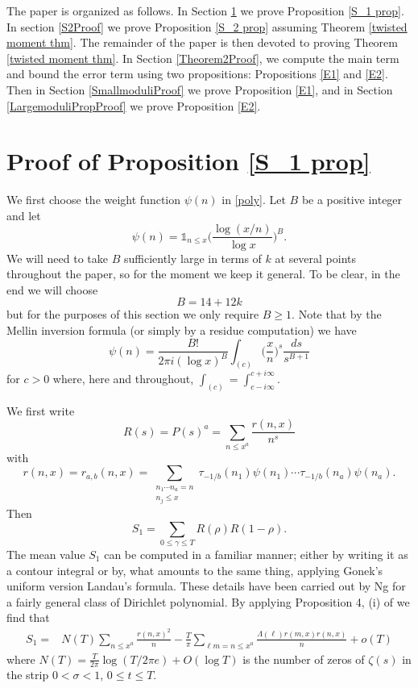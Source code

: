 \documentclass[oneside, 12pt]{amsart}
\theoremstyle{definition}
\newcommand{\leqs}{\leqslant }
\newcommand{\geqs}{\geqslant }
\begin{document}
The paper is organized as follows. In Section \ref{S1Proof} we prove Proposition \ref{S_1 prop}. In section \ref{S2Proof} we prove Proposition \ref{S_2 prop} assuming Theorem \ref{twisted moment thm}. The remainder of the paper is then devoted to proving Theorem \ref{twisted moment thm}. In Section \ref{Theorem2Proof}, we compute the main term and bound the error term using two propositions: Propositions \ref{E1} and \ref{E2}. Then in Section \ref{SmallmoduliProof} we prove Proposition \ref{E1}, and in Section \ref{LargemoduliPropProof} we prove Proposition \ref{E2}.













\section{Proof of Proposition \ref{S_1 prop}}\label{S1Proof}
We first choose the weight function $\psi(n)$ in \eqref{poly}. Let $B$ be a positive integer and let
\begin{equation}
\label{psi choice}
\psi(n)=\mathds{1}_{n\leqs x}\bigg(\frac{\log(x/n)}{\log x}\bigg)^B.
\end{equation}
We will need to take $B$ sufficiently large in terms of $k$ at several points throughout the paper, so for the moment we keep it general. To be clear, in the end we will choose 
\[
B=14+12k
\] 
but for the purposes of this section we only require $B\geqs 1$. 
Note that by the Mellin inversion formula (or simply by a residue computation) we have 
\begin{equation}
\label{mellin}
\psi(n)=\frac{B!}{2\pi i(\log x)^B  }\int_{(c)}\bigg(\frac{x}{n}\bigg)^s\frac{ds}{s^{B+1}}
\end{equation}
for $c>0$ where, here and throughout, $\int_{(c)}=\int_{c-i\infty}^{c+i\infty}$.

We first write
\[
R(s)=P(s)^a=\sum_{n\leqs x^a}\frac{r(n,x)}{n^s}
\]
with
\[
r(n,x)=r_{a,b}(n,x)=\sum_{\substack{n_1\cdots n_a=n \\ n_j\leqs x}}\tau_{-1/b}(n_1)\psi(n_1)\cdots \tau_{-1/b}(n_a)\psi(n_a).
\]
Then 
\[
S_1=\sum_{0\leqs \gamma\leqs T}R(\rho)R(1-\rho).
\]
The mean value $S_1$ can be computed in a familiar manner; either by writing it as a contour integral or by, what amounts to the same thing, applying Gonek's uniform version Landau's formula.
These details have been carried out by Ng \cite{Ng} for a fairly general class of Dirichlet polynomial. By applying Proposition 4, (i) of \cite{Ng} we find that 
\begin{equation}
\begin{split}
\label{Ngs}
        S_1
    = & N(T)\sum_{n\leqs x^a}\frac{r(n,x)^2}{n}
     -\frac{T}{\pi}\sum_{\ell m=n\leqs x^a}\frac{\Lambda(\ell)r(m,x)r(n,x)}{n}+o(T)
\end{split}
\end{equation}
where $N(T)=\frac{T}{2\pi}\log(T/2\pi e)+O(\log T)$ is the number of zeros of $\zeta(s)$ in the strip $0<\sigma<1$, $0\leqs t\leqs T$. 
\end{document}
